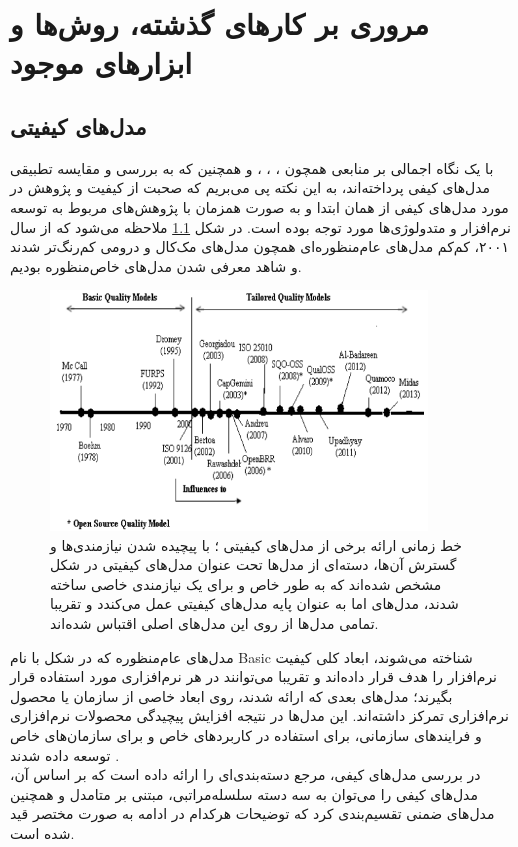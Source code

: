 \chapter{مروری بر کارهای گذشته، روش‌ها و ابزارهای موجود}
\section{مدل‌های کیفیتی}
با یک نگاه اجمالی بر منابعی همچون
\cite{wagner_software_2013}،
\cite{seffah_usability_2006}، 
\cite{pressman_software_2015}،
\cite{p._miguel_review_2014}
و همچنین
\cite{sommerville_software_2016}
که به بررسی و مقایسه تطبیقی مدل‌های کیفی پرداخته‌اند، به این نکته پی می‌بریم که صحبت از کیفیت و پژوهش در مورد مدل‌های کیفی از همان ابتدا و به صورت همزمان با پژوهش‌های مربوط به توسعه نرم‌افزار و متدولوژی‌ها مورد توجه بوده است.
در شکل
\ref{fig:qmodels}
ملاحظه می‌شود که از سال ۲۰۰۱، کم‌کم مدل‌های عام‌منظوره‌ای همچون مدل‌های مک‌کال و درومی
کم‌رنگ‌تر شدند و شاهد معرفی شدن مدل‌های خاص‌منظوره بودیم.
\begin{figure}[H]
	\centering\includegraphics[width=10cm]{Resources/qmodels.PNG}
	\caption[خط زمانی ارائه مدل‌های کیفیتی]
	{خط زمانی ارائه برخی از مدل‌های کیفیتی
		\cite{p._miguel_review_2014}؛
		با پیچیده شدن نیازمندی‌ها و گسترش آن‌ها، دسته‌ای از مدل‌ها تحت عنوان مدل‌های کیفیتی
		در شکل مشخص شده‌اند که به طور خاص و برای یک نیازمندی خاصی ساخته شدند، مدل‌های
		اما به عنوان پایه مدل‌های کیفیتی عمل می‌کندد و تقریبا تمامی مدل‌ها از روی این مدل‌های اصلی اقتباس شده‌اند.
	}
	\label{fig:qmodels}
\end{figure}
مدل‌های عام‌منظوره که در شکل با نام Basic شناخته می‌شوند، ابعاد کلی کیفیت نرم‌افزار را هدف قرار داده‌اند و تقریبا می‌توانند در هر نرم‌افزاری مورد استفاده قرار بگیرند؛ مدل‌های بعدی که ارائه شدند، روی ابعاد خاصی از سازمان یا محصول نرم‌افزاری تمرکز داشته‌اند. این مدل‌ها در نتیجه افزایش پیچیدگی محصولات نرم‌افزاری و فرایندهای سازمانی، برای استفاده در کاربردهای خاص و برای سازمان‌های خاص توسعه داده شدند
\cite{p._miguel_review_2014}.\\
در بررسی مدل‌های کیفی، مرجع
\cite{wagner_software_2013}
دسته‌بندی‌ای را ارائه داده است که بر اساس آن، مدل‌های کیفی را می‌توان به سه دسته سلسله‌مراتبی، مبتنی بر متامدل و همچنین مدل‌های ضمنی تقسیم‌بندی کرد که توضیحات هرکدام در ادامه به صورت مختصر قید شده است.
